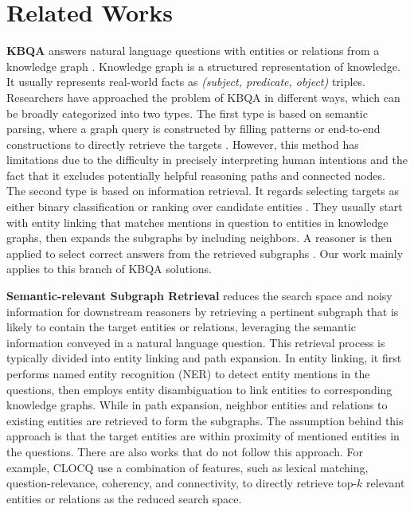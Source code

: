 \documentclass[runningheads]{llncs}
\begin{document}
\section{Related Works}

\textbf{KBQA} answers natural language questions with entities or relations from a knowledge graph \cite{lan2022kgqasurvey}. Knowledge graph is a structured representation of knowledge. It usually represents real-world facts as \textit{(subject, predicate, object)} triples. Researchers have approached the problem of KBQA in different ways, which can be broadly categorized into two types. The first type is based on semantic parsing, where a graph query is constructed by filling patterns or end-to-end constructions to directly retrieve the targets \cite{yih2015semanticparsing,das2022kgqacase}. However, this method has limitations due to the difficulty in precisely interpreting human intentions and the fact that it excludes potentially helpful reasoning paths and connected nodes. The second type is based on information retrieval. It regards selecting targets as either binary classification or ranking over candidate entities \cite{fu2020kbqasurvey}. They usually start with entity linking that matches mentions in question to entities in knowledge graphs, then expands the subgraphs by including neighbors. A reasoner is then applied to select correct answers from the retrieved subgraphs \cite{zhang2022ruckbqa,chaudhuri2021grounding,yasunaga2021qagnn}. Our work mainly applies to this branch of KBQA solutions.

\bigskip

\noindent \textbf{Semantic-relevant Subgraph Retrieval} reduces the search space and noisy information for downstream reasoners by retrieving a pertinent subgraph that is likely to contain the target entities or relations,  leveraging the semantic information conveyed in a natural language question. This retrieval process is typically divided into entity linking and path expansion. In entity linking, it first performs named entity recognition (NER) to detect entity mentions in the questions, then employs entity disambiguation to link entities to corresponding knowledge graphs. While in path expansion, neighbor entities and relations to existing entities are retrieved to form the subgraphs. The assumption behind this approach is that the target entities are within proximity of mentioned entities in the questions. There are also works that do not follow this approach. For example, CLOCQ \cite{christmann2022beyondned} use a combination of features, such as lexical matching, question-relevance, coherency, and connectivity, to directly retrieve top-$k$ relevant entities or relations as the reduced search space. 
\end{document}
